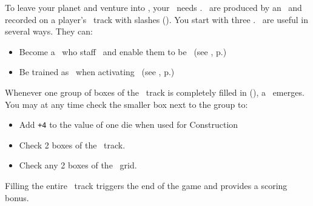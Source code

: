 To leave your planet and venture into \outerspace, your \planet\ needs
\astronauts.  \astronauts\ are produced by an \academy\ and recorded on a 
player's \population\ track with slashes (\gainastronautsymbol).  You start with
three \astronauts.
\newline\newline
\astronauts\ are useful in several ways. They can:
\begin{itemize}
	\item Become a \specialist\ who staff \armaments\ and enable them to be 
        \activated\ (see , p.\pageref{sec:armaments})
	\item Be trained as \pilots\ when activating \starships\ (see 
        , p.\pageref{sec:military})
\end{itemize}
Whenever one group of boxes of the \population\ track is completely filled in 
(\gainastronautsymbol), a \greatperson\ emerges.  You may at any time check the
smaller box next to the group to:
\begin{itemize}
  \item Add \texttt{+4} to the value of one die when used for Construction
  \item Check 2 boxes of the \tech\ track.
  \item Check any 2 boxes of the \culture\ grid.
\end{itemize}
Filling the entire \population\ track triggers the end of the game and provides a scoring bonus.
